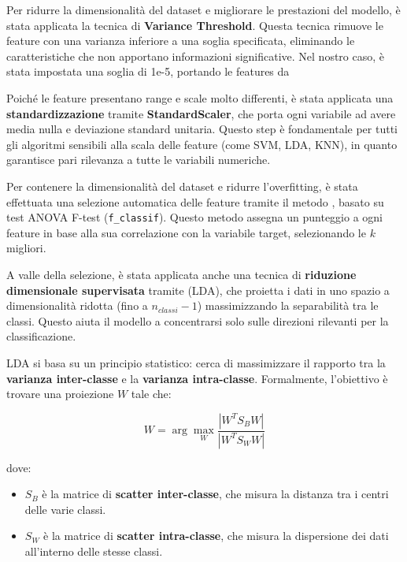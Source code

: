 \documentclass[minted, draw]{../tex/hebdomon}
\begin{document}
Per ridurre la dimensionalità del dataset e migliorare le prestazioni del modello, è stata applicata la tecnica di \textbf{Variance Threshold}. Questa tecnica rimuove le feature con una varianza inferiore a una soglia specificata, eliminando le caratteristiche che non apportano informazioni significative. Nel nostro caso, è stata impostata una soglia di 1e-5, portando le features da 

Poiché le feature presentano range e scale molto differenti, è stata applicata una \textbf{standardizzazione} tramite \textbf{StandardScaler}, che porta ogni variabile ad avere media nulla e deviazione standard unitaria. Questo step è fondamentale per tutti gli algoritmi sensibili alla scala delle feature (come SVM, LDA, KNN), in quanto garantisce pari rilevanza a tutte le variabili numeriche.


Per contenere la dimensionalità del dataset e ridurre l’overfitting, è stata effettuata una selezione automatica delle feature tramite il metodo , basato su test ANOVA F-test (\texttt{f\_classif}). Questo metodo assegna un punteggio a ogni feature in base alla sua correlazione con la variabile target, selezionando le $k$ migliori.

A valle della selezione, è stata applicata anche una tecnica di \textbf{riduzione dimensionale supervisata} tramite  (LDA), che proietta i dati in uno spazio a dimensionalità ridotta (fino a $n_{classi} - 1$) massimizzando la separabilità tra le classi. Questo aiuta il modello a concentrarsi solo sulle direzioni rilevanti per la classificazione.

LDA si basa su un principio statistico: cerca di massimizzare il rapporto tra la \textbf{varianza inter-classe} e la \textbf{varianza intra-classe}. Formalmente, l'obiettivo è trovare una proiezione $W$ tale che:

\[
W = \arg\max_W \frac{|W^T S_B W|}{|W^T S_W W|}
\]

dove:
\begin{itemize}
\item $S_B$ è la matrice di \textbf{scatter inter-classe}, che misura la distanza tra i centri delle varie classi.
\item $S_W$ è la matrice di \textbf{scatter intra-classe}, che misura la dispersione dei dati all'interno delle stesse classi.
\end{itemize}
\end{document}
